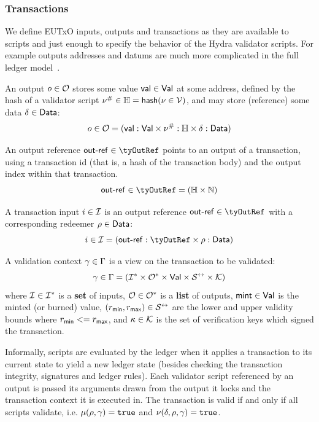 \subsubsection{Transactions}

We define EUTxO inputs, outputs and transactions as they are available to
scripts and just enough to specify the behavior of the Hydra validator scripts.
For example outputs addresses and datums are much more complicated in the full
ledger model~\cite{eutxo-2, ledger-shelley-spec}.

\begin{definition}[Outputs]
	An output $o \in \mathcal{O}$ stores some value $\mathsf{val} \in \mathsf{Val}$ at some address,
	defined by the hash of a validator script $\nu^{\#} \in \mathbb{H} = \mathsf{hash}(\nu \in \mathcal{V})$,
	and may store (reference) some data $\delta \in \mathsf{Data}$:
	\[
		o \in \mathcal{O} = (\mathsf{val} : \mathsf{Val} \times \nu^{\#} : \mathbb{H} \times \delta : \mathsf{Data})
	\]
\end{definition}

\begin{definition}
	An output reference $\txOutRef \in \tyOutRef$ points to an output of a
	transaction, using a transaction id (that is, a hash of the transaction body)
	and the output index within that transaction.
	\[
		\txOutRef \in \tyOutRef = (\tyBytes \times \mathbb{N})
	\]
\end{definition}

\begin{definition}[Inputs]
	A transaction input $i \in \mathcal{I}$ is an output reference
	$\txOutRef \in \tyOutRef$ with a corresponding redeemer $\rho \in \mathsf{Data}$:
	\[
		i \in \txInputs = (\txOutRef : \tyOutRef \times \rho : \tyData)
	\]
\end{definition}

\begin{definition}
	A validation context $\gamma \in \Gamma$ is a view on the transaction
	to be validated:
	\[
		\gamma \in \Gamma = (\mathcal{I}^* \times \mathcal{O}^* \times \mathsf{Val} \times \mathcal{S}^{\leftrightarrow} \times \mathcal{K})
	\]
	where $\mathcal{I} \in \mathcal{I}^*$ is a \textbf{set} of inputs,
	$\mathcal{O} \in \mathcal{O}^*$ is a \textbf{list} of outputs,
	$\mathsf{mint} \in \mathsf{Val}$ is the minted (or burned) value,
	$(r_{\mathsf{min}}, r_{\mathsf{max}}) \in \mathcal{S}^{\leftrightarrow}$
	 are
	the lower and upper validity bounds where $r_{\mathsf{min}} <= r_{\mathsf{max}}$, and $\kappa \in \mathcal{K}$ is the set
	of verification keys which signed the transaction.
\end{definition}

Informally, scripts are evaluated by the ledger when it applies a transaction to
its current state to yield a new ledger state (besides checking the transaction
integrity, signatures and ledger rules). Each validator script referenced by
an output is passed its arguments drawn from the output it locks and the
transaction context it is executed in. The transaction is valid if and only if
all scripts validate, i.e. $\mu(\rho, \gamma) = \mathtt{true}$ and
$\nu(\delta, \rho, \gamma) = \mathtt{true}$.

